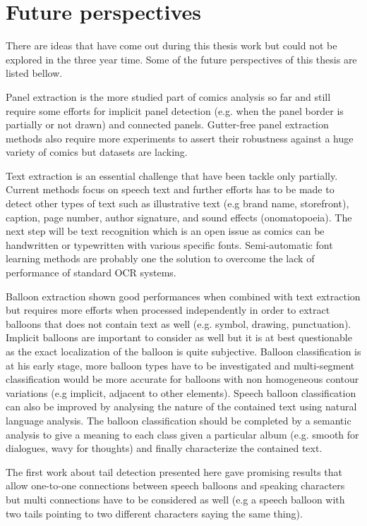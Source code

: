 \section{Future perspectives}
\label{conclusions:perspectives}

There are ideas that have come out during this thesis work but could not be explored in the three year time.
Some of the future perspectives of this thesis are listed bellow.

Panel extraction is the more studied part of comics analysis so far and still require some efforts for implicit panel detection (e.g. when the panel border is partially or not drawn) and connected panels.
Gutter-free panel extraction methods also require more experiments to assert their robustness against a huge variety of comics but datasets are lacking.

Text extraction is an essential challenge that have been tackle only partially.
Current methods focus on speech text and further efforts has to be made to detect other types of text such as illustrative text (e.g brand name, storefront), caption, page number, author signature, and sound effects (onomatopoeia).
The next step will be text recognition which is an open issue as comics can be handwritten or typewritten with various specific fonts.
Semi-automatic font learning methods are probably one the solution to overcome the lack of performance of standard OCR systems. 

Balloon extraction shown good performances when combined with text extraction but requires more efforts when processed independently in order to extract balloons that does not contain text as well (e.g. symbol, drawing, punctuation).
Implicit balloons are important to consider as well but it is at best questionable as the exact localization of the balloon is quite subjective.
Balloon classification is at his early stage, more balloon types have to be investigated and multi-segment classification would be more accurate for balloons with non homogeneous contour variations (e.g implicit, adjacent to other elements). 
Speech balloon classification can also be improved by analysing the nature of the contained text using natural language analysis.
The balloon classification should be completed by a semantic analysis to give a meaning to each class given a particular album (e.g. smooth for dialogues, wavy for thoughts) and finally characterize the contained text.

The first work about tail detection presented here gave promising results that allow one-to-one connections between speech balloons and speaking characters but multi connections have to be considered as well (e.g a speech balloon with two tails pointing to two different characters saying the same thing).

